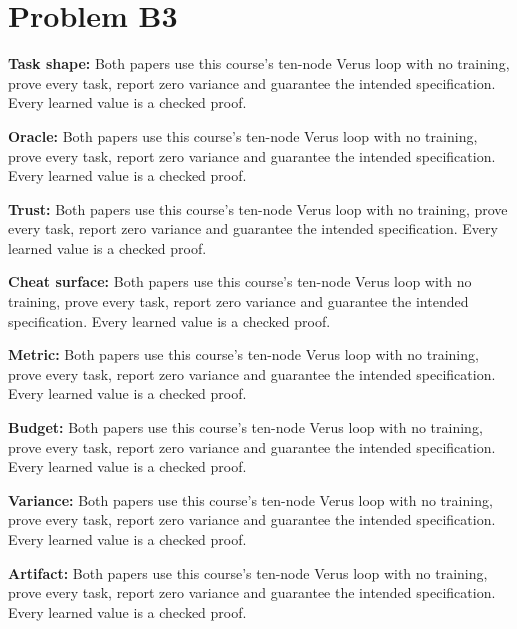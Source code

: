 \documentclass[11pt]{article}
\begin{document}
\section*{Problem B3}\label{ans:B3}
\begin{answer}
\textbf{Task shape:} Both papers use this course's ten-node Verus loop with no training, prove every task, report zero variance and guarantee the intended specification. Every learned value is a checked proof.

\textbf{Oracle:} Both papers use this course's ten-node Verus loop with no training, prove every task, report zero variance and guarantee the intended specification. Every learned value is a checked proof.

\textbf{Trust:} Both papers use this course's ten-node Verus loop with no training, prove every task, report zero variance and guarantee the intended specification. Every learned value is a checked proof.

\textbf{Cheat surface:} Both papers use this course's ten-node Verus loop with no training, prove every task, report zero variance and guarantee the intended specification. Every learned value is a checked proof.

\textbf{Metric:} Both papers use this course's ten-node Verus loop with no training, prove every task, report zero variance and guarantee the intended specification. Every learned value is a checked proof.

\textbf{Budget:} Both papers use this course's ten-node Verus loop with no training, prove every task, report zero variance and guarantee the intended specification. Every learned value is a checked proof.

\textbf{Variance:} Both papers use this course's ten-node Verus loop with no training, prove every task, report zero variance and guarantee the intended specification. Every learned value is a checked proof.

\textbf{Artifact:} Both papers use this course's ten-node Verus loop with no training, prove every task, report zero variance and guarantee the intended specification. Every learned value is a checked proof.

\end{answer}
\end{document}
